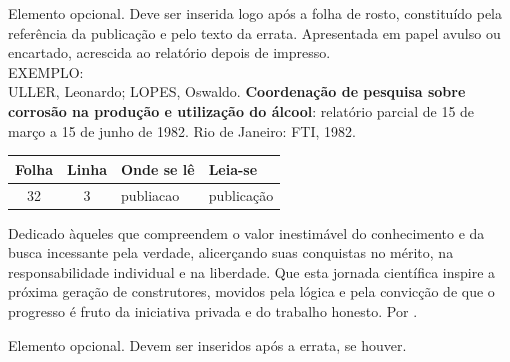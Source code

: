 \documentclass{Arquivos/AcademicoPadrao}
\begin{document}
\nocite{*}


\pretextual %


\folhaderosto
\contracapa


\fichaCatalografica


\begin{errata}
\noindent Elemento opcional. Deve ser inserida logo após a folha de rosto, constituído pela referência da publicação e pelo texto da errata. Apresentada em papel avulso ou encartado, acrescida ao relatório depois de impresso.\\[1em]

\noindent EXEMPLO:\\[1em]

\noindent ULLER, Leonardo; LOPES, Oswaldo. \textbf{Coordenação de pesquisa sobre corrosão na produção e utilização do álcool}: relatório parcial de 15 de março a 15 de junho de 1982. Rio de Janeiro: FTI, 1982.\\[1em]

\renewcommand{\arraystretch}{1.5}
\begin{center}
    \begin{tabular}{|c|c|l|l|}
        \hline
        Folha & Linha & Onde se lê & Leia-se \\
        \hline
        32 & 3 & publiacao & publicação \\
        \hline
    \end{tabular}
\end{center}
\end{errata}



\folhadeaprovacao{\today}


\begin{dedicatoria}
    Dedicado àqueles que compreendem o valor
    inestimável do conhecimento e da busca incessante
    pela verdade, alicerçando suas conquistas no mérito,
    na responsabilidade individual e na liberdade.
    Que esta jornada científica inspire a próxima
    geração de construtores, movidos pela lógica
    e pela convicção de que o progresso 
    é fruto da iniciativa privada e do 
    trabalho honesto. Por \textbf{\WenesTex}.
\end{dedicatoria}



Elemento opcional. Devem ser inseridos após a errata, se houver.
\end{document}

